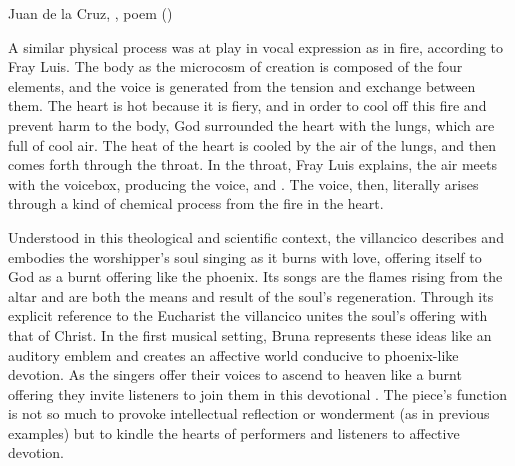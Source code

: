 
\begin{poemexample}
    \caption{Juan de la Cruz, , poem
    ()} 
    \label{poem:Juan_de_la_Cruz-Llama-opening}
\end{poemexample}

A similar physical process was at play in vocal expression as in fire,
according to Fray Luis.
The body as the microcosm of creation is composed of the four elements, and the
voice is generated from the tension and exchange between them.
The heart is hot because it is fiery, and in order to cool off this fire and
prevent harm to the body, God surrounded the heart with the lungs, which are
full of cool air. 
The heat of the heart is cooled by the air of the lungs, and then comes forth
through the throat.
In the throat, Fray Luis explains, the air meets with the voicebox, producing
the voice, and .%
    \Autocite[435]{LuisdeGranada:Simbolo}
The voice, then, literally arises through a kind of chemical process from the
fire in the heart.

	
Understood in this theological and scientific context, the villancico
 describes and embodies the worshipper's soul singing
as it burns with love, offering itself to God as a burnt offering like the
phoenix.
Its songs are the flames rising from the altar and are both the means and
result of the soul's regeneration.
Through its explicit reference to the Eucharist the villancico unites the
soul's offering with that of Christ.
In the first musical setting, Bruna represents these ideas like an auditory
emblem and creates an affective world conducive to phoenix-like devotion.
As the singers offer their voices to ascend to heaven like a burnt offering
they invite listeners to join them in this devotional .
The piece's function is not so much to provoke intellectual reflection or
wonderment (as in previous examples) but to kindle the hearts of performers and
listeners to affective devotion.

